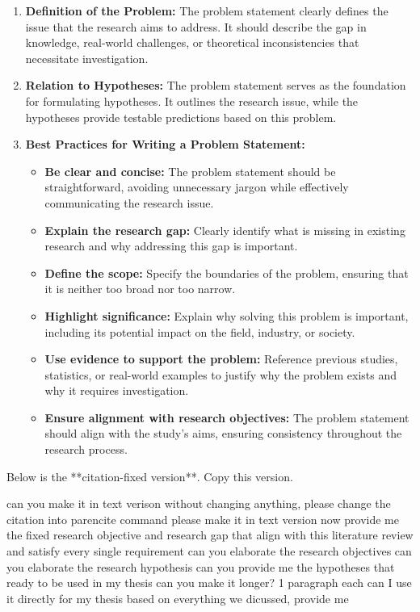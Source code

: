 \begin{enumerate}
    \item \textbf{Definition of the Problem:} The problem statement clearly defines the issue that the research aims to address. It should describe the gap in knowledge, real-world challenges, or theoretical inconsistencies that necessitate investigation.

    \item \textbf{Relation to Hypotheses:} The problem statement serves as the foundation for formulating hypotheses. It outlines the research issue, while the hypotheses provide testable predictions based on this problem.

    \item \textbf{Best Practices for Writing a Problem Statement:}
    \begin{itemize}
        \item \textbf{Be clear and concise:} The problem statement should be straightforward, avoiding unnecessary jargon while effectively communicating the research issue.
        \item \textbf{Explain the research gap:} Clearly identify what is missing in existing research and why addressing this gap is important.
        \item \textbf{Define the scope:} Specify the boundaries of the problem, ensuring that it is neither too broad nor too narrow.
        \item \textbf{Highlight significance:} Explain why solving this problem is important, including its potential impact on the field, industry, or society.
        \item \textbf{Use evidence to support the problem:} Reference previous studies, statistics, or real-world examples to justify why the problem exists and why it requires investigation.
        \item \textbf{Ensure alignment with research objectives:} The problem statement should align with the study’s aims, ensuring consistency throughout the research process.
    \end{itemize}
\end{enumerate}

Below is the **citation-fixed version**. Copy this version.

can you make it in text verison
without changing anything, please change the citation into parencite command
please make it in text version
now provide me the fixed research objective and research gap that align with this literature review and satisfy every single requirement
can you elaborate the research objectives
can you elaborate the research hypothesis
can you provide me the hypotheses that ready to be used in my thesis
can you make it longer? 1 paragraph each
can I use it directly for my thesis
based on everything we dicussed, provide me

